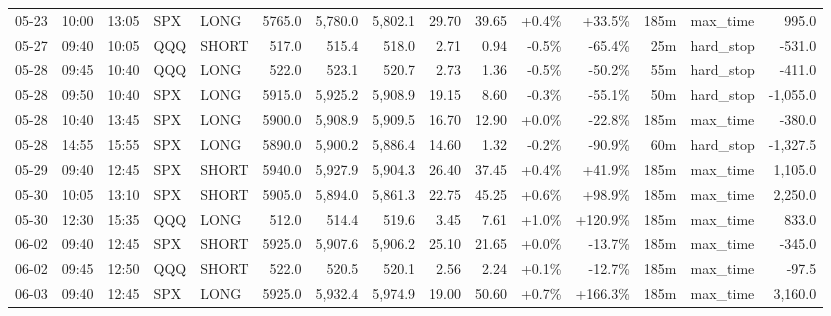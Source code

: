 \documentclass[11pt,a4paper,twoside]{article}
\begin{document}
\begin{landscape}
\begin{center}
\begin{longtable}{>{\color{txtmain}}l l l l l r r r r r r r r >{\color{txtmain}}l r}
05-23 & 10:00 & 13:05 & SPX & LONG & 5765.0 & 5,780.0 & 5,802.1 & 29.70 & 39.65 & \textcolor{wingreen}{+0.4\%} & \textcolor{wingreen}{+33.5\%} & 185m & max\_time & \textcolor{wingreen}{995.0} \\
05-27 & 09:40 & 10:05 & QQQ & SHORT & 517.0 & 515.4 & 518.0 & 2.71 & 0.94 & \textcolor{lossred}{-0.5\%} & \textcolor{lossred}{-65.4\%} & 25m & hard\_stop & \textcolor{lossred}{-531.0} \\
05-28 & 09:45 & 10:40 & QQQ & LONG & 522.0 & 523.1 & 520.7 & 2.73 & 1.36 & \textcolor{lossred}{-0.5\%} & \textcolor{lossred}{-50.2\%} & 55m & hard\_stop & \textcolor{lossred}{-411.0} \\
05-28 & 09:50 & 10:40 & SPX & LONG & 5915.0 & 5,925.2 & 5,908.9 & 19.15 & 8.60 & \textcolor{lossred}{-0.3\%} & \textcolor{lossred}{-55.1\%} & 50m & hard\_stop & \textcolor{lossred}{-1,055.0} \\
05-28 & 10:40 & 13:45 & SPX & LONG & 5900.0 & 5,908.9 & 5,909.5 & 16.70 & 12.90 & \textcolor{wingreen}{+0.0\%} & \textcolor{lossred}{-22.8\%} & 185m & max\_time & \textcolor{lossred}{-380.0} \\
05-28 & 14:55 & 15:55 & SPX & LONG & 5890.0 & 5,900.2 & 5,886.4 & 14.60 & 1.32 & \textcolor{lossred}{-0.2\%} & \textcolor{lossred}{-90.9\%} & 60m & hard\_stop & \textcolor{lossred}{-1,327.5} \\
05-29 & 09:40 & 12:45 & SPX & SHORT & 5940.0 & 5,927.9 & 5,904.3 & 26.40 & 37.45 & \textcolor{wingreen}{+0.4\%} & \textcolor{wingreen}{+41.9\%} & 185m & max\_time & \textcolor{wingreen}{1,105.0} \\
05-30 & 10:05 & 13:10 & SPX & SHORT & 5905.0 & 5,894.0 & 5,861.3 & 22.75 & 45.25 & \textcolor{wingreen}{+0.6\%} & \textcolor{wingreen}{+98.9\%} & 185m & max\_time & \textcolor{wingreen}{2,250.0} \\
05-30 & 12:30 & 15:35 & QQQ & LONG & 512.0 & 514.4 & 519.6 & 3.45 & 7.61 & \textcolor{wingreen}{+1.0\%} & \textcolor{wingreen}{+120.9\%} & 185m & max\_time & \textcolor{wingreen}{833.0} \\
06-02 & 09:40 & 12:45 & SPX & SHORT & 5925.0 & 5,907.6 & 5,906.2 & 25.10 & 21.65 & \textcolor{wingreen}{+0.0\%} & \textcolor{lossred}{-13.7\%} & 185m & max\_time & \textcolor{lossred}{-345.0} \\
06-02 & 09:45 & 12:50 & QQQ & SHORT & 522.0 & 520.5 & 520.1 & 2.56 & 2.24 & \textcolor{wingreen}{+0.1\%} & \textcolor{lossred}{-12.7\%} & 185m & max\_time & \textcolor{lossred}{-97.5} \\
06-03 & 09:40 & 12:45 & SPX & LONG & 5925.0 & 5,932.4 & 5,974.9 & 19.00 & 50.60 & \textcolor{wingreen}{+0.7\%} & \textcolor{wingreen}{+166.3\%} & 185m & max\_time & \textcolor{wingreen}{3,160.0} \\

\end{longtable}
\end{center}
\end{landscape}
\end{document}
